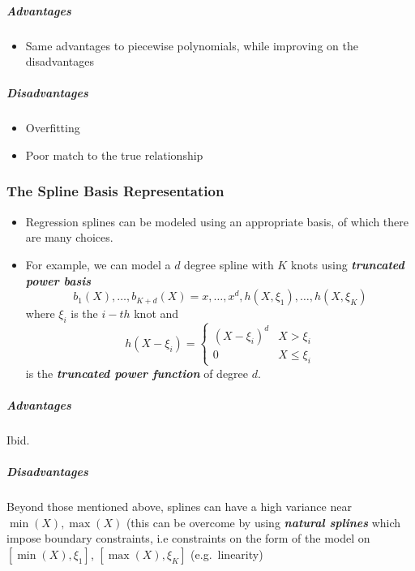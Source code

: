 \documentclass[11pt]{article}
\providecommand{\tightlist}{%
      \setlength{\itemsep}{0pt}\setlength{\parskip}{0pt}}
\begin{document}
    \hypertarget{advantages}{%
\subparagraph{Advantages}\label{advantages}}

    \begin{itemize}
\tightlist
\item
  Same advantages to piecewise polynomials, while improving on the
  disadvantages
\end{itemize}

    \hypertarget{disadvantages}{%
\subparagraph{Disadvantages}\label{disadvantages}}

    \begin{itemize}
\tightlist
\item
  Overfitting
\item
  Poor match to the true relationship
\end{itemize}

    \hypertarget{the-spline-basis-representation}{%
\subsubsection{The Spline Basis
Representation}\label{the-spline-basis-representation}}

    \begin{itemize}
\tightlist
\item
  Regression splines can be modeled using an appropriate basis, of which
  there are many choices.
\item
  For example, we can model a \(d\) degree spline with \(K\) knots using
  \textbf{\emph{truncated power basis}}
  \[b_1(X), \dots, b_{K+d}(X) = x, \dots, x^d, h(X, \xi_1), \dots, h(X, \xi_K)\]
  where \(\xi_i\) is the \(i-th\) knot and \[h(X - \xi_i) =
    \begin{cases} 
        (X-\xi_i)^d & X > \xi_i\\
        0 & X \leqslant \xi_i
    \end{cases}\] is the \textbf{\emph{truncated power function}} of
  degree \(d\).
\end{itemize}

    \hypertarget{advantages}{%
\subparagraph{Advantages}\label{advantages}}

    Ibid.

    \hypertarget{disadvantages}{%
\subparagraph{Disadvantages}\label{disadvantages}}

    Beyond those mentioned above, splines can have a high variance near
\(\min(X), \max(X)\) (this can be overcome by using
\textbf{\emph{natural splines}} which impose boundary constraints, i.e
constraints on the form of the model on \([\min(X), \xi_1]\),
\([\max(X), \xi_K]\) (e.g.~linearity)
\end{document}
